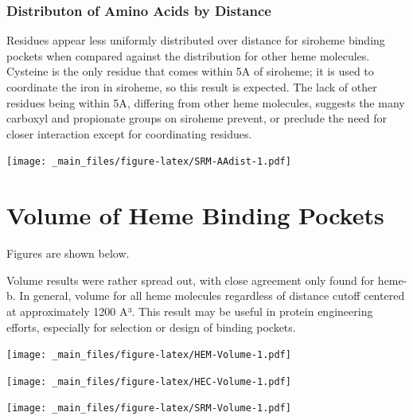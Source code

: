 \documentclass[a4paper, nobind]{templates/ociamthesis}
\let\origfigure\figure
\let\endorigfigure\endfigure
\renewenvironment{figure}[1][2] {
    \expandafter\origfigure\expandafter[H]
} {
    \endorigfigure
}
\begin{document}
\hypertarget{distributon-of-amino-acids-by-distance-3}{%
\subsubsection{Distributon of Amino Acids by Distance}\label{distributon-of-amino-acids-by-distance-3}}

Residues appear less uniformly distributed over distance for siroheme binding pockets when compared against the distribution for other heme molecules. Cysteine is the only residue that comes within 5A of siroheme; it is used to coordinate the iron in siroheme, so this result is expected. The lack of other residues being within 5A, differing from other heme molecules, suggests the many carboxyl and propionate groups on siroheme prevent, or preclude the need for closer interaction except for coordinating residues.

\begin{figure}
\centering
\texttt{[image: \_main\_files/figure-latex/SRM-AAdist-1.pdf]}
\caption{\label{fig:SRM-AAdist}SRM: Residue Distribution by Distance}
\end{figure}

\hypertarget{volume-of-heme-binding-pockets}{%
\section{Volume of Heme Binding Pockets}\label{volume-of-heme-binding-pockets}}

Figures are shown below.

Volume results were rather spread out, with close agreement only found for heme-b. In general, volume for all heme molecules regardless of distance cutoff centered at approximately 1200 A³. This result may be useful in protein engineering efforts, especially for selection or design of binding pockets.

\begin{figure}
\centering
\texttt{[image: \_main\_files/figure-latex/HEM-Volume-1.pdf]}
\caption{\label{fig:HEM-Volume}HEM: Volume}
\end{figure}

\begin{figure}
\centering
\texttt{[image: \_main\_files/figure-latex/HEC-Volume-1.pdf]}
\caption{\label{fig:HEC-Volume}HEC: Volume}
\end{figure}

\begin{figure}
\centering
\texttt{[image: \_main\_files/figure-latex/SRM-Volume-1.pdf]}
\caption{\label{fig:SRM-Volume}SRM: Volume}
\end{figure}
\end{document}
